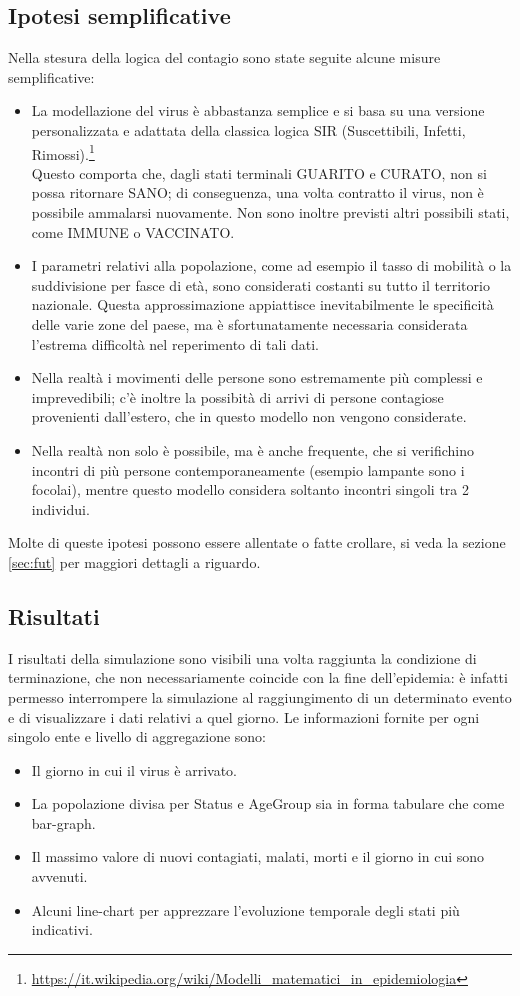 \documentclass[a4paper, 12pt]{article}
\begin{document}
	\subsection{Ipotesi semplificative}
		Nella stesura della logica del contagio sono state seguite alcune misure semplificative:
		
			\begin{itemize}
			\item La modellazione del virus è abbastanza semplice e si basa su una versione personalizzata e adattata della classica logica SIR (Suscettibili, Infetti, Rimossi).\footnote{\url{https://it.wikipedia.org/wiki/Modelli_matematici_in_epidemiologia}}\\
			Questo comporta che, dagli stati terminali GUARITO e CURATO, non si possa ritornare SANO; di conseguenza, una volta contratto il virus, non è possibile ammalarsi nuovamente. Non sono inoltre previsti altri possibili stati, come IMMUNE o VACCINATO.
			\item I parametri relativi alla popolazione, come ad esempio il tasso di mobilità o la suddivisione per fasce di età, sono considerati costanti su tutto il territorio nazionale. Questa approssimazione appiattisce inevitabilmente le specificità delle varie zone del paese, ma è sfortunatamente necessaria considerata l'estrema difficoltà nel reperimento di tali dati.
			\item Nella realtà i movimenti delle persone sono estremamente più complessi e imprevedibili; c'è inoltre la possibità di arrivi di persone contagiose provenienti dall'estero, che in questo modello non vengono considerate.
			\item Nella realtà non solo è possibile, ma è anche frequente, che si verifichino incontri di più persone contemporaneamente (esempio lampante sono i focolai), mentre questo modello considera soltanto incontri singoli tra 2 individui.
		\end{itemize}
		Molte di queste ipotesi possono essere allentate o fatte crollare, si veda la sezione \vref{sec:fut} per maggiori dettagli a riguardo.
		
	\subsection{Risultati}
		I risultati della simulazione sono visibili una volta raggiunta la condizione di terminazione, che non necessariamente coincide con la fine dell'epidemia: è infatti permesso interrompere la simulazione al raggiungimento di un determinato evento e di visualizzare i dati relativi a quel giorno.
		Le informazioni fornite per ogni singolo ente e livello di aggregazione sono:
		\begin{itemize}
			\item Il giorno in cui il virus è arrivato.
			\item La popolazione divisa per Status e AgeGroup sia in forma tabulare che come bar-graph.
			\item Il massimo valore di nuovi contagiati, malati, morti e il giorno in cui sono avvenuti.
			\item Alcuni line-chart per apprezzare l'evoluzione temporale degli stati più indicativi.
		\end{itemize}
\end{document}

